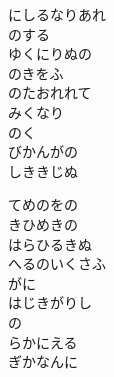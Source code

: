 \documentclass[10pt,b5j]{tarticle} %
\begin{document}
\begin{enumerate}
\begin{minipage}[c]{\blocksize}
        \vspace{\linespace}
        \item
        にしるなりあれ\\
        のする\\
        ゆくにりぬの\\
        のきをふ\\
        のたおれれて\\
        みくなり\\
        のく\\
        びかんがの\\
        しききじぬ
        
        \vspace{\linespace}
        \item
        てめのをの\\
        きひめきの\\
        はらひるきぬ\\
        へるのいくさふ\\
        がに\\
        はじきがりし\\
        の\\
        らかにえる\\
        ぎかなんに
    
    \end{minipage}
\end{enumerate} %
\end{document}
